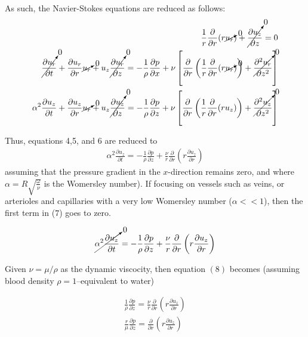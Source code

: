 \documentclass[12pt, a4paper]{article}
\theoremstyle{plain}
\theoremstyle{definition}
\theoremstyle{remark}
\begin{document}

As such, the Navier-Stokes equations are reduced as follows:
\begin{align}
\frac{1}{r}\frac{\partial}{\partial r} (r\cancelto{0}{u_r}) + \cancelto{0}{\frac{\partial u_z}{\partial z}} = 0 \\
\cancelto{0}{\frac{\partial u_r}{\partial t}} + \frac{\partial u_r}{\partial r}\cancelto{0}{u_r} + u_z \cancelto{0}{\frac{\partial u_r}{\partial z}} = -\frac{1}{\rho} \frac{\partial p}{\partial x} + \nu \left[  \frac{\partial}{\partial r} \left( \frac{1}{r} \frac{\partial}{\partial r} (r\cancelto{0}{u_r})  \right) + \cancelto{0}{\frac{\partial^2u_r}{\partial z^2}}       \right]\\
\alpha^2\frac{\partial u_z}{\partial t} + \frac{\partial u_z}{\partial r}\cancelto{0}{u_r} + u_z \cancelto{0}{\frac{\partial u_z}{\partial z}} = -\frac{1}{\rho} \frac{\partial p}{\partial z} + \nu \left[  \frac{\partial}{\partial r} \left( \frac{1}{r} \frac{\partial}{\partial r} (ru_z)  \right) + \cancelto{0}{\frac{\partial^2u_z}{\partial z^2}}       \right]
\end{align}

Thus, equations 4,5, and 6 are reduced to 
\begin{align}
 \alpha^2\frac{\partial u_z}{\partial t} = -\frac{1}{\rho} \frac{\partial p}{\partial z} + \frac{\nu}{r} \frac{\partial}{\partial r} \left(  r \frac{\partial u_z}{\partial r}   \right)
\end{align}
assuming that the pressure gradient in the $x$-direction remains zero, and where $\alpha=R\sqrt{\frac{\omega}{\nu}}$ is the Womersley number). If focusing on vessels such as veins, or arterioles and capillaries with a very low Womersley number ($\alpha < < 1$), then the first term in ($7$) goes to zero.

\begin{align}
 \cancelto{0}{\alpha^2\frac{\partial u_z}{\partial t}} = -\frac{1}{\rho} \frac{\partial p}{\partial z} + \frac{\nu}{r} \frac{\partial}{\partial r} \left(  r \frac{\partial u_z}{\partial r}   \right)
\end{align}

Given $\nu = \mu / \rho$ as the dynamic viscocity, then equation $(8)$ becomes (assuming blood density $\rho=1$--equivalent to water)

\begin{align}
 \frac{1}{\rho} \frac{\partial p}{\partial z} = \frac{\nu}{r} \frac{\partial}{\partial r} \left(  r \frac{\partial u_z}{\partial r}   \right)\\
\frac{r}{\mu} \frac{\partial p}{\partial z} = \frac{\partial}{\partial r} \left(  r \frac{\partial u_z}{\partial r}   \right)
\end{align}
\end{document}
